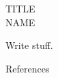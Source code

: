 \documentclass[12pt,letterpaper,english]{article}
\newcommand{\todo}[1]{{\color{red}#1}}
\begin{document}
\centering
\todo{TITLE} \\
\todo{NAME}


\raggedright
\setlength{\parindent}{0.5in}

\todo{Write stuff.}


\newpage

\centering
References

\raggedright
\printbibliography[heading=none]
\end{document}
